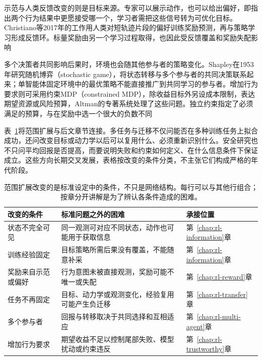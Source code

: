 示范与人类反馈改变的则是目标来源。专家可以展示动作，也可以给出偏好，即指出两个行为结果中更愿接受哪一个，学习者需把这些信号转为可优化目标。Christiano等2017年的工作用人类对短轨迹片段的偏好训练奖励预测，再与策略学习形成反馈环。标量奖励由另一个学习过程取得，也因此受反馈覆盖和奖励失配影响

多个决策者共同影响后果时，环境也会随其他参与者的策略变化。Shapley在1953年研究随机博弈（stochastic game），将状态转移与多个参与者的共同决策联系起来；单智能体固定环境中的最优策略不能直接推广到共同学习的参与者。增加行为要求则可采用约束MDP（constrained MDP），除收益目标外另设成本限制，表达期望资源或风险预算，Altman的专著系统处理了这些问题。独立约束指定了必须满足的预算，与在奖励中选一个很大的负数不同

表~\ref{tab:rl-overview-expansion}将范围扩展与后文章节连接。多任务与迁移不仅问能否在多种训练任务上拟合成功，还问改变目标或动力学以后可以复用什么、必须重新识别什么。安全研究也不只问平均回报是否提高，而要说明失败和约束如何定义、在什么信息条件下保证成立。这些方向长期交叉发展，表格按改变的条件分类，不主张它们构成严格的年代阶段。

\begin{table}[htbp]
  \centering\small
  \begin{tabularx}{\linewidth}{@{}>{\raggedright\arraybackslash}p{29mm}>{\raggedright\arraybackslash}X>{\raggedright\arraybackslash}p{32mm}@{}}
    \toprule
    改变的条件 & 标准问题之外的困难 & 承接位置\\
    \midrule
    状态不完全可见 & 同一观测可对应不同状态，动作也可能用于获取信息 & 第~\ref{chap:rl-information}章\\
    训练经验固定 & 目标策略所需后果没有覆盖，不能随意补采 & 第~\ref{chap:rl-information}章\\
    奖励来自示范或偏好 & 行为意图未被直接观测，奖励可能不唯一或失配 & 第~\ref{chap:rl-reward}章\\
    任务不再固定 & 目标、动力学或观测变化，经验复用可能产生负迁移 & 第~\ref{chap:rl-transfer}章\\
    多个参与者 & 回报与转移取决于共同选择和互相适应 & 第~\ref{chap:rl-multi-agent}章\\
    增加行为要求 & 期望收益不足以控制尾部失败、模型扰动或约束违反 & 第~\ref{chap:rl-trustworthy}章\\
    \bottomrule
  \end{tabularx}
  \caption{范围扩展改变的是标准设定中的条件，不只是网络结构。每行可以与其他行组合；按章分开讲解是为了辨认各条件造成的困难。}
  \label{tab:rl-overview-expansion}
\end{table}

